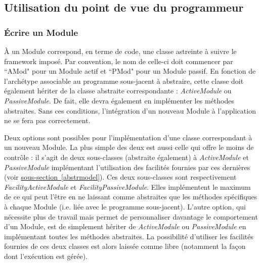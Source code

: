 \documentclass[]{article}
\newcommand{\wordlink}[2]{\hyperref[#1]{#2~\ref{#1}}}
\begin{document}
\subsection{Utilisation du point de vue du programmeur}

\subsubsection{Écrire un Module}
\label{writemod}

À un Module correspond, en terme de code, une classe astreinte à suivre le framework imposé. Par convention, le nom de celle-ci doit commencer par ``AMod" pour un Module actif et ``PMod" pour un Module passif. En fonction de l'archétype associable au programme sous-jacent à abstraire, cette classe doit également hériter de la classe abstraite correspondante : \textit{ActiveModule} ou \textit{PassiveModule}. De fait, elle devra également en implémenter les méthodes abstraites. Sans ces conditions, l'intégration d'un nouveau Module à l'application ne se fera pas correctement.\\

\par Deux options sont possibles pour l'implémentation d'une classe correspondant à un nouveau Module. La plus simple des deux est aussi celle qui offre le moins de contrôle : il s'agit de deux sous-classes (abstraite également) à \textit{ActiveModule} et \textit{PassiveModule} implémentant l'utilisation des facilités fournies par ces dernières (voir \wordlink{abstrmodel}{sous-section}). Ces deux sous-classes sont respectivement \textit{FacilityActiveModule} et \textit{FacilityPassiveModule}. Elles implémentent le maximum de ce qui peut l'être en ne laissant comme abstraites que les méthodes spécifiques à chaque Module (i.e. liée avec le programme sous-jacent). L'autre option, qui nécessite plus de travail mais permet de personnaliser davantage le comportement d'un Module, est de simplement hériter de \textit{ActiveModule} ou \textit{PassiveModule} en implémentant toutes les méthodes abstraites. La possibilité d'utiliser les facilités fournies de ces deux classes est alors laissée comme libre (notamment la façon dont l'exécution est gérée).\\ 
\end{document}
